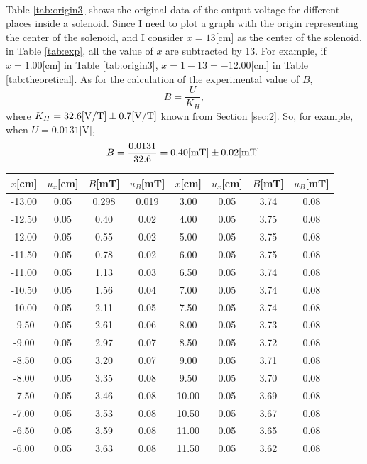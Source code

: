 \documentclass[a4paper]{article}
\begin{document}
    \paragraph{} Table \ref{tab:origin3} shows the original data of the output voltage for different places inside a solenoid. Since I need to plot a graph with the origin representing the center of the solenoid, and I consider $x=13$[cm] as the center of the solenoid, in Table \ref{tab:exp}, all the value of $x$ are subtracted by 13. For example, if $x=1.00$[cm] in Table \ref{tab:origin3}, $x=1-13=-12.00$[cm] in Table \ref{tab:theoretical}. As for the calculation of the experimental value of $B$, $$B=\frac{U}{K_H},$$ where $K_H=32.6[\rm V/T]\pm 0.7[V/T]$ known from Section \ref{sec:2}. So, for example, when $U=0.0131$[V], $$B=\frac{0.0131}{32.6}=0.40[\rm mT]\pm 0.02[mT].$$
    \begin{table}[H]
        \centering
        \begin{tabular}{|c|c|c|c||c|c|c|c|}
            \hline
            $x$[cm]&$u_x$[cm]&$B$[mT]&$u_B$[mT]&$x$[cm]&$u_x$[cm]&$B$[mT]&$u_B$[mT]\\\hline
            -13.00&0.05&0.298&0.019&3.00&0.05&3.74&0.08\\\hline
            -12.50&0.05&0.40&0.02&4.00&0.05&3.75&0.08\\\hline
            -12.00&0.05&0.55&0.02&5.00&0.05&3.75&0.08\\\hline
            -11.50&0.05&0.78&0.02&6.00&0.05&3.75&0.08\\\hline
            -11.00&0.05&1.13&0.03&6.50&0.05&3.74&0.08\\\hline
            -10.50&0.05&1.56&0.04&7.00&0.05&3.74&0.08\\\hline
            -10.00&0.05&2.11&0.05&7.50&0.05&3.74&0.08\\\hline
            -9.50&0.05&2.61&0.06&8.00&0.05&3.73&0.08\\\hline
            -9.00&0.05&2.97&0.07&8.50&0.05&3.72&0.08\\\hline
            -8.50&0.05&3.20&0.07&9.00&0.05&3.71&0.08\\\hline
            -8.00&0.05&3.35&0.08&9.50&0.05&3.70&0.08\\\hline
            -7.50&0.05&3.46&0.08&10.00&0.05&3.69&0.08\\\hline
            -7.00&0.05&3.53&0.08&10.50&0.05&3.67&0.08\\\hline
            -6.50&0.05&3.59&0.08&11.00&0.05&3.65&0.08\\\hline
            -6.00&0.05&3.63&0.08&11.50&0.05&3.62&0.08\\\hline

\end{tabular}
\end{table}
\end{document}
